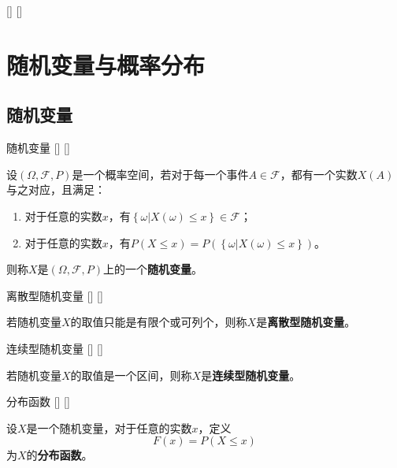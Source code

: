 \documentclass[UTF8]{ctexart}
\begin{document}
        \begin{ppt}
            []
            {}
            []
            []
            
        \end{ppt}

\section{随机变量与概率分布}

    \subsection{随机变量}

        \begin{dfn}
            []
            {随机变量}
            []
            []


            设$(\Omega,\mathcal{F},P)$是一个概率空间，若对于每一个事件$A\in\mathcal{F}$，都有一个实数$X(A)$与之对应，且满足：

            \begin{enumerate}
                \item 对于任意的实数$x$，有$\left\{\omega|X(\omega)\leq x\right\}\in\mathcal{F}$；
                \item 对于任意的实数$x$，有$P\left(X\leq x\right)=P\left(\left\{\omega|X(\omega)\leq x\right\}\right)$。
            \end{enumerate}

            则称$X$是$(\Omega,\mathcal{F},P)$上的一个\textbf{随机变量}。
        \end{dfn}

        \begin{dfn}
            []
            {离散型随机变量}
            []
            []


            若随机变量$X$的取值只能是有限个或可列个，则称$X$是\textbf{离散型随机变量}。
        \end{dfn}

        \begin{dfn}
            []
            {连续型随机变量}
            []
            []


            若随机变量$X$的取值是一个区间，则称$X$是\textbf{连续型随机变量}。
        \end{dfn}

        \begin{dfn}
            []
            {分布函数}
            []
            []


            设$X$是一个随机变量，对于任意的实数$x$，定义\[F(x)=P(X\leq x)\]为$X$的\textbf{分布函数}。
        \end{dfn}
\end{document}
